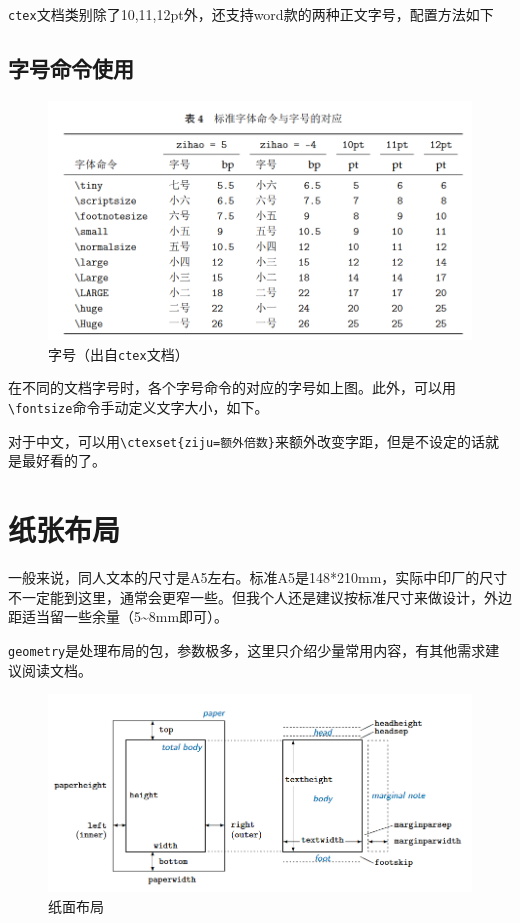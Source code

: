 \documentclass[10pt,openany]{book}
\begin{document}
\texttt{ctex}文档类别除了10,11,12pt外，还支持word款的两种正文字号，配置方法如下



\subsection{字号命令使用}

\begin{figure}[H]
    \centering
    \includegraphics[width=\linewidth]{data/fontsize.png}
    \caption{字号（出自\texttt{ctex}文档）}
\end{figure}

在不同的文档字号时，各个字号命令的对应的字号如上图。此外，可以用\texttt{\textbackslash{}fontsize}命令手动定义文字大小，如下。



对于中文，可以用\texttt{\textbackslash{}ctexset\{ziju=额外倍数\}}来额外改变字距，但是不设定的话就是最好看的了。

\section{纸张布局}

一般来说，同人文本的尺寸是A5左右。标准A5是148*210mm，实际中印厂的尺寸不一定能到这里，通常会更窄一些。但我个人还是建议按标准尺寸来做设计，外边距适当留一些余量（5\textasciitilde8mm即可）。

\texttt{geometry}是处理布局的包，参数极多，这里只介绍少量常用内容，有其他需求建议阅读文档。

\begin{figure}[H]
    \centering
    \includegraphics[width=\linewidth]{data/paper.png}
    \caption{纸面布局}
\end{figure}
\end{document}
